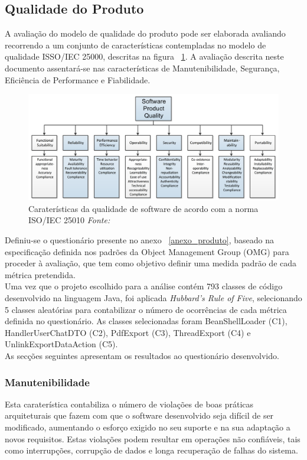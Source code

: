\documentclass[openany,10pt,a4paper]{article}
\begin{document}
\subsection{Qualidade do Produto}
A avaliação do modelo de qualidade do produto pode ser elaborada avaliando recorrendo a um conjunto de características contempladas no modelo de qualidade ISSO/IEC 25000, descritas na figura ~\ref{fig_quality}. A avaliação descrita neste documento assentará-se nas características de Manutenibilidade, Segurança, Eficiência de Performance e Fiabilidade.

\begin{figure}[h]
	\centering
	\includegraphics[width=1\linewidth]{quality.PNG}
	\caption{Caraterísticas da qualidade de software de acordo com a norma ISO/IEC 25010 \small{\textit{Fonte: 	\cite{OMG_Performance}}}}
	\label{fig_quality}
\end{figure}

Definiu-se o questionário presente no anexo ~\ref{anexo_produto}, baseado na especificação definida nos padrões da Object Management Group (OMG) para proceder à avaliação, que tem como objetivo definir uma medida padrão de cada métrica pretendida. \\
Uma vez que o projeto escolhido para a análise contém 793 classes de código desenvolvido na linguagem Java, foi aplicada 
\textit{Hubbard’s Rule of Five}, selecionando 5 classes aleatórias para contabilizar o número de ocorrências de cada métrica definida no questionário. As classes selecionadas foram BeanShellLoader (C1), HandlerUserChatDTO (C2), PdfExport (C3), ThreadExport (C4) e UnlinkExportDataAction (C5). \\
As secções seguintes apresentam os resultados ao questionário desenvolvido.

\subsubsection{Manutenibilidade}
Esta caraterística contabiliza o número de violações de boas práticas arquiteturais que fazem com que o software desenvolvido seja difícil de ser modificado, aumentando o esforço exigido no seu suporte e na sua adaptação a novos requisitos. Estas violações podem resultar em operações não confiáveis, tais como interrupções, corrupção de dados e longa recuperação de falhas do sistema. \cite{OMG_Maintainability}
\end{document}
